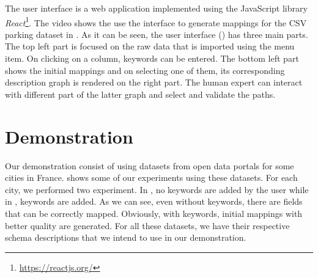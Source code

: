 The user interface is a web application implemented using the JavaScript library \emph{React}\footnote{\url{https://reactjs.org/}}. The video shows the use the interface to generate mappings for the CSV parking dataset in . As it can be seen, the user interface () has three main parts. The top left part is focused on the raw data that is imported using the  menu item. On clicking on a column, keywords can be entered. The bottom left part shows the initial mappings and on selecting one of them, its corresponding description graph is rendered on the right part. The human expert can interact with different part of the latter graph and select and validate the paths. 

\section{Demonstration}\label{sec:demonstration}
Our demonstration consist of using datasets from open data portals for some cities in France.  shows some of our experiments using these datasets. For each city, we performed two experiment. In , no keywords are added by the user while in , keywords are added. As we can see, even without keywords, there are fields that can be correctly mapped. Obviously, with keywords, initial mappings with better quality are generated. For all these datasets, we have their respective schema descriptions that we intend to use in our demonstration. 



